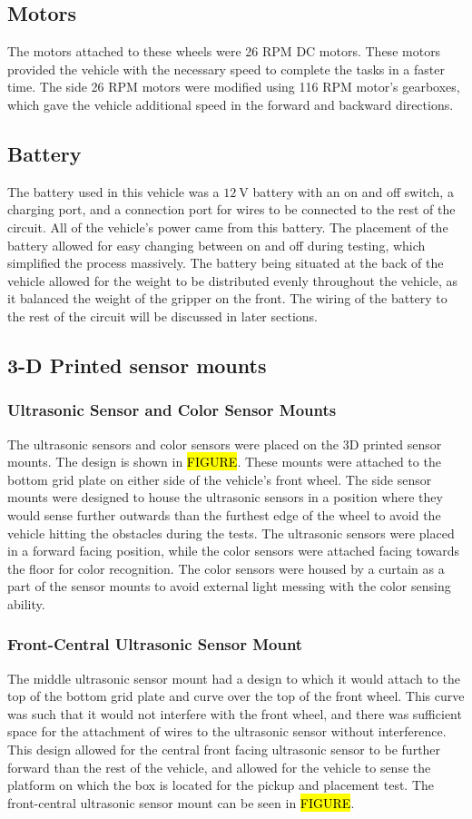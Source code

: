 \documentclass[11pt]{report}
\begin{document}
\subsection{Motors}
The motors attached to these wheels were 26 \gls{RPM} \gls{DC} motors. These motors provided the vehicle with the necessary speed to complete the tasks in a faster time. The side 26 \gls{RPM} motors were modified using 116 \gls{RPM} motor’s gearboxes, which gave the vehicle additional speed in the forward and backward directions. 
\subsection{Battery}
The battery used in this vehicle was a $\SI{12}{\volt}$ battery with an on and off switch, a charging port, and a connection port for wires to be connected to the rest of the circuit. All of the vehicle’s power came from this battery. The placement of the battery allowed for easy changing between on and off during testing, which simplified the process massively. The battery being situated at the back of the vehicle allowed for the weight to be distributed evenly throughout the vehicle, as it balanced the weight of the gripper on the front. The wiring of the battery to the rest of the circuit will be discussed in later sections. 
\subsection{3-D Printed sensor mounts}
\subsubsection{Ultrasonic Sensor and Color Sensor Mounts}
The ultrasonic sensors and color sensors were placed on the 3D printed sensor mounts. The design is shown in \hl{FIGURE}. These mounts were attached to the bottom grid plate on either side of the vehicle’s front wheel. The side sensor mounts were designed to house the ultrasonic sensors in a position where they would sense further outwards than the furthest edge of the wheel to avoid the vehicle hitting the obstacles during the tests. The ultrasonic sensors were placed in a forward facing position, while the color sensors were attached facing towards the floor for color recognition. The color sensors were housed by a curtain as a part of the sensor mounts to avoid external light messing with the color sensing ability.
\subsubsection{Front-Central Ultrasonic Sensor Mount}
The middle ultrasonic sensor mount had a design to which it would attach to the top of the bottom grid plate and curve over the top of the front wheel. This curve was such that it would not interfere with the front wheel, and there was sufficient space for the attachment of wires to the ultrasonic sensor without interference. This design allowed for the central front facing ultrasonic sensor to be further forward than the rest of the vehicle, and allowed for the vehicle to sense the platform on which the box is located for the pickup and placement test. The front-central ultrasonic sensor mount can be seen in \hl{FIGURE}.
\end{document}
